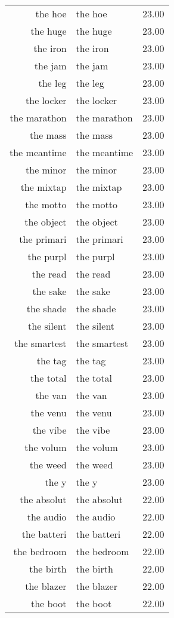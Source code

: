 \begin{table}[ht]
\begin{tabular}{rlr}
  the hoe & the hoe & 23.00 \\ 
  the huge & the huge & 23.00 \\ 
  the iron & the iron & 23.00 \\ 
  the jam & the jam & 23.00 \\ 
  the leg & the leg & 23.00 \\ 
  the locker & the locker & 23.00 \\ 
  the marathon & the marathon & 23.00 \\ 
  the mass & the mass & 23.00 \\ 
  the meantime & the meantime & 23.00 \\ 
  the minor & the minor & 23.00 \\ 
  the mixtap & the mixtap & 23.00 \\ 
  the motto & the motto & 23.00 \\ 
  the object & the object & 23.00 \\ 
  the primari & the primari & 23.00 \\ 
  the purpl & the purpl & 23.00 \\ 
  the read & the read & 23.00 \\ 
  the sake & the sake & 23.00 \\ 
  the shade & the shade & 23.00 \\ 
  the silent & the silent & 23.00 \\ 
  the smartest & the smartest & 23.00 \\ 
  the tag & the tag & 23.00 \\ 
  the total & the total & 23.00 \\ 
  the van & the van & 23.00 \\ 
  the venu & the venu & 23.00 \\ 
  the vibe & the vibe & 23.00 \\ 
  the volum & the volum & 23.00 \\ 
  the weed & the weed & 23.00 \\ 
  the y & the y & 23.00 \\ 
  the absolut & the absolut & 22.00 \\ 
  the audio & the audio & 22.00 \\ 
  the batteri & the batteri & 22.00 \\ 
  the bedroom & the bedroom & 22.00 \\ 
  the birth & the birth & 22.00 \\ 
  the blazer & the blazer & 22.00 \\ 
  the boot & the boot & 22.00 \\ 

\end{tabular}
\end{table}
